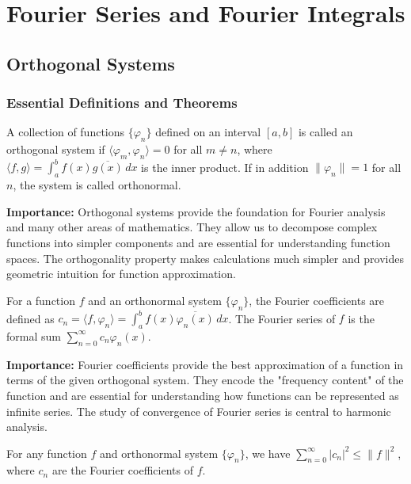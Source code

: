 \chapter{Fourier Series and Fourier Integrals}

\section{Orthogonal Systems}

\subsection*{Essential Definitions and Theorems}

\begin{definition}
A collection of functions $\{\varphi_n\}$ defined on an interval $[a, b]$ is called an orthogonal system if $\langle \varphi_m, \varphi_n \rangle = 0$ for all $m \neq n$, where $\langle f, g \rangle = \int_a^b f(x) \overline{g(x)} \, dx$ is the inner product. If in addition $\|\varphi_n\| = 1$ for all $n$, the system is called orthonormal.
\end{definition}

\noindent\textbf{Importance:} Orthogonal systems provide the foundation for Fourier analysis and many other areas of mathematics. They allow us to decompose complex functions into simpler components and are essential for understanding function spaces. The orthogonality property makes calculations much simpler and provides geometric intuition for function approximation.



\begin{definition}
For a function $f$ and an orthonormal system $\{\varphi_n\}$, the Fourier coefficients are defined as $c_n = \langle f, \varphi_n \rangle = \int_a^b f(x) \overline{\varphi_n(x)} \, dx$. The Fourier series of $f$ is the formal sum $\sum_{n=0}^{\infty} c_n \varphi_n(x)$.
\end{definition}

\noindent\textbf{Importance:} Fourier coefficients provide the best approximation of a function in terms of the given orthogonal system. They encode the "frequency content" of the function and are essential for understanding how functions can be represented as infinite series. The study of convergence of Fourier series is central to harmonic analysis.



\begin{theorem}
For any function $f$ and orthonormal system $\{\varphi_n\}$, we have $\sum_{n=0}^{\infty} |c_n|^2 \leq \|f\|^2$, where $c_n$ are the Fourier coefficients of $f$.
\end{theorem}

